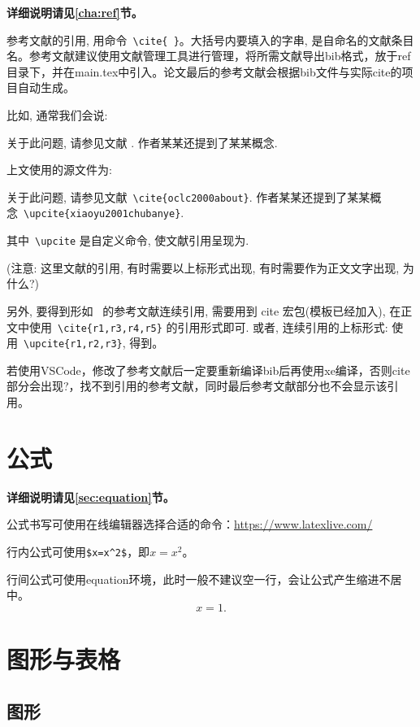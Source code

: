 \textbf{详细说明请见\ref{cha:ref}节。}

参考文献的引用, 用命令~\verb|\cite{ }|。大括号内要填入的字串, 是自命名的文献条目名。参考文献建议使用文献管理工具进行管理，将所需文献导出bib格式，放于ref目录下，并在main.tex中引入。论文最后的参考文献会根据bib文件与实际cite的项目自动生成。

比如, 通常我们会说:

 {\kaishu
关于此问题, 请参见文献 \cite{oclc2000about}. 作者某某还提到了某某概念.}


上文使用的源文件为:

 {\kaishu
关于此问题, 请参见文献~\verb|\cite{oclc2000about}|. 作者某某还提到了某某概念~\verb|\upcite{xiaoyu2001chubanye}|.
}

其中~\verb|\upcite| 是自定义命令, 使文献引用呈现为.

({\heiti 注意:} {\kaishu 这里文献的引用, 有时需要以上标形式出现, 有时需要作为正文文字出现, 为什么?})

另外, 要得到形如~\cite{r1,r3,r4,r5} 的参考文献连续引用, 需要用到 cite 宏包(模板已经加入),
在正文中使用~\verb|\cite{r1,r3,r4,r5}| 的引用形式即可.
或者, 连续引用的上标形式: 使用~\verb|\upcite{r1,r2,r3}|, 得到。

若使用VSCode，修改了参考文献后一定要重新编译bib后再使用xe编译，否则cite部分会出现?，找不到引用的参考文献，同时最后参考文献部分也不会显示该引用。

\section{公式}

\textbf{详细说明请见\ref{sec:equation}节。}

公式书写可使用在线编辑器选择合适的命令：\url{https://www.latexlive.com/}

行内公式可使用\verb|$x=x^2$|，即$x=x^2$。

行间公式可使用equation环境，此时一般不建议空一行，会让公式产生缩进不居中。
\begin{equation}
x = 1.
\end{equation}

\section{图形与表格}

\subsection{图形}

